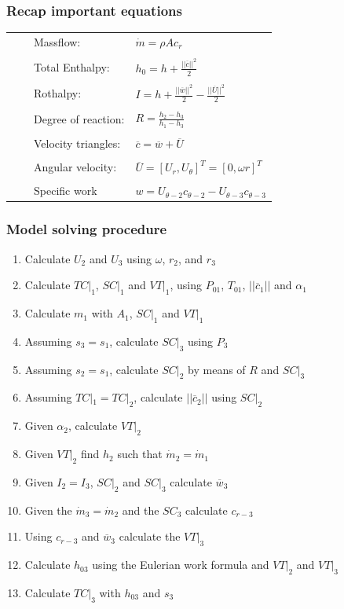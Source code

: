 \documentclass{beamer}
\newcommand{\tabitem}{~~\llap{\textbullet}~~}
\begin{document}
\begin{frame}
	\frametitle{Recap important equations }
	\begin{tabular}{ll} 
 		{\tabitem Massflow:} & $\dot{m}=\rho A c_r$ \\ \\ 
       {\tabitem Total Enthalpy:} & $h_0 = h + \frac{||\overline{c}||^2}{2}$ \\ \\
	   {\tabitem Rothalpy:} & $I = h + \frac{||\overline{w}||^2}{2} - \frac{||\overline{U}||^2}{2}$ \\ \\
	   {\tabitem Degree of reaction:} & $R = \frac{h_2-h_3}{h_1-h_3}$ \\ \\
	   {\tabitem Velocity triangles:} & $\overline{c} = \overline{w} + \overline{U}$ \\ \\
	   {\tabitem Angular velocity:} & $\overline{U}= [U_r, U_\theta]^T = [0 , \omega r]^T$ \\ \\
	   {\tabitem Specific work} & $ w = U_{\theta-2} c_{\theta-2} - U_{\theta-3} c_{\theta-3}$
     \end{tabular}
\end{frame}


\begin{frame}
	\frametitle{Model solving procedure }

\begin{enumerate}
	\item Calculate $U_2$ and $U_3$ using $\omega$, $r_2$, and $r_3$
	\item Calculate $TC|_1$, $SC|_1$ and $VT|_1$, using $P_{01}$, $T_{01}$, $||\overline c_1||$ and $\alpha_1$ 
	\item Calculate $m_1$ with $A_1$, $SC|_1$ and $VT|_1$

	\bigskip
	\item Assuming $s_3=s_1$, calculate $SC|_3$ using $P_3$
	\item Assuming $s_2=s_1$, calculate $SC|_2$ by means of $R$ and $SC|_3$
	\item Assuming $TC|_1=TC|_2$, calculate $||\overline c_2||$ using $SC|_2$
	\item Given $\alpha_2$, calculate $VT|_2$
	\item Given $VT|_2$ find $h_2$ such that $\dot{m}_2=\dot{m}_1$
	
	\bigskip

        \item Given $I_2=I_3$, $SC|_2$ and $SC|_3$ calculate $\overline{w}_3$
	\item Given the $\dot{m}_3=\dot{m}_2$ and the $SC_3$ calculate $c_{r-3}$
	\item Using $c_{r-3}$ and $\overline{w}_3$ calculate the $VT|_3$
	\item Calculate $h_{03}$ using the Eulerian work formula and $VT|_2$ and $VT|_3$
	\item Calculate $TC|_3$ with $h_{03}$ and $s_3$ 
\end{enumerate}
\end{frame}
\end{document}
